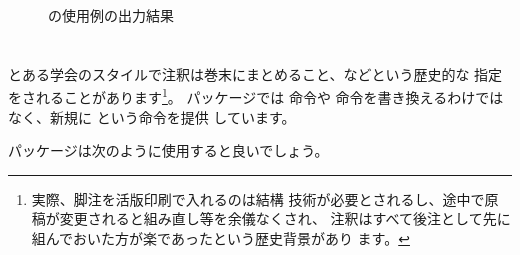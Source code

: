 \begin{figure}[htbp]
   \IOmargin
   \caption{の使用例の出力結果}\label{fig:ftnright}%
\end{figure}


\section{\texorpdfstring{\zdash}{---}}
とある学会のスタイルで注釈は巻末にまとめること、などという歴史的な
指定をされることがあります\footnote{実際、脚注を活版印刷で入れるのは結構
技術が必要とされるし、途中で原稿が変更されると組み直し等を余儀なくされ、
注釈はすべて後注として先に組んでおいた方が楽であったという歴史背景があり
ます。}。 パッケージでは  命令や 
命令を書き換えるわけではなく、新規に  という命令を提供
しています。
\begin{Syntax}
\end{Syntax}
パッケージは次のように使用すると良いでしょう。


